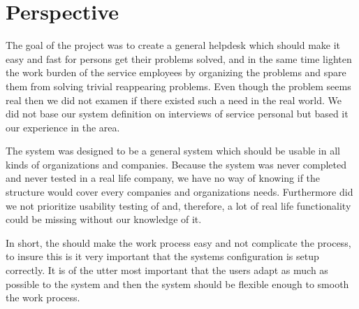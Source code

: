 \chapter{Perspective}
\label{chap:perspective}
The goal of the project was to create a general helpdesk which should make it easy and fast for persons get their problems solved, and in the same time lighten the work burden of the service employees by organizing the problems and spare them from solving trivial reappearing problems. Even though the problem seems real then we did not examen if there existed such a need in the real world. We did not base our system definition on interviews of service personal but based it our experience in the area. 

The system was designed to be a general system which should be usable in all kinds of organizations and companies. Because the system was never completed and never tested in a real life company, we have no way of knowing if the structure would cover every companies and organizations needs. Furthermore did we not prioritize usability testing of \hdesk[] and, therefore, a lot of real life functionality could be missing without our knowledge of it.   

In short, the \hdesk[] should make the work process easy and not complicate the process, to insure this is it very important that the systems configuration is setup correctly. It is of the utter most important that the users adapt as much as possible to the system and then the system should be flexible enough to smooth the work process.   


